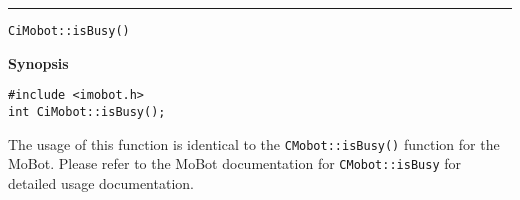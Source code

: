 \noindent
\vspace{5pt}
\rule{6.5in}{0.015in}
\noindent
{\LARGE \texttt{CiMobot::isBusy()}}\\
{}

\noindent
{\bf Synopsis}\\
\begin{verbatim}
#include <imobot.h>
int CiMobot::isBusy();
\end{verbatim}

The usage of this function is identical to the
\texttt{CMobot::isBusy()} function for the MoBot. Please refer
to the MoBot documentation for \texttt{CMobot::isBusy} for
detailed usage documentation.

